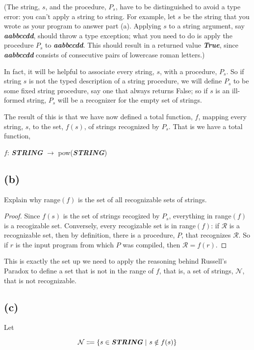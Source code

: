 \documentclass[14pt]{extarticle}
\newcommand{\str}[1]{\textit{\textbf{#1}}}
\begin{document}
(The string, $s$, and the procedure, $P_s$, have to be distinguished to avoid a type error: you can't apply a string to string. For example, let $s$ be the string that you wrote as your program to answer part (a). Applying $s$ to a string argument, say \str{aabbccdd}, should throw a type exception; what you need to do is apply the procedure $P_s$ to \str{aabbccdd}. This should result in a returned value \str{True}, since \str{aabbccdd} consists of consecutive pairs of lowercase roman letters.)

In fact, it will be helpful to associate every string, $s$, with a procedure, $P_s$. So if string $s$ is not the typed description of a string procedure, we will define $P_s$ to be some fixed string procedure, say one that always returns False; so if $s$ is an ill-formed string, $P_s$ will be a recognizer for the empty set of strings.

The result of this is that we have now defined a total function, $f$, mapping every string, $s$, to the set, $f(s)$, of strings recognized by $P_s$. That is we have a total function, 

\begin{center}
$f$: \str{STRING} $\to$ pow(\str{STRING})
\end{center}

\subsection{(b)}
Explain why range$(f)$ is the set of all recognizable sets of strings.
\begin{proof}
Since $f(s)$ is the set of strings recogized by $P_s$, everything in range$(f)$ is a recogizable set. Conversely, every recogizable set is in range$(f)$: if $\mathcal{R}$ is a recognizable set, then by definition, there is a procedure, $P$, that recognizes $\mathcal{R}$. So if $r$ is the input program from which $P$ was compiled, then $\mathcal{R} = f(r)$.
\end{proof}

This is exactly the set up we need to apply the reasoning behind Russell's Paradox to define a set that is not in the range of $f$, that is, a set of strings, $\mathcal{N}$, that is not recognizable.

\subsection{(c)}
Let 

$$
\mathcal{N} \Coloneqq \{s \in \str{STRING} \,\,|\,\, s \notin f(s)\}
$$
\end{document}
